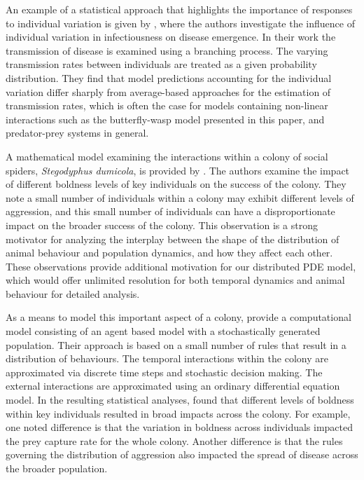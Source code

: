 \documentclass[review,authoryear]{elsarticle}
\begin{document}
An example of a statistical approach that highlights the importance of
responses to individual variation is given by \cite{SuperspreadingLloyd}, where the authors investigate the influence of individual variation in infectiousness on disease emergence. In their work the transmission of
disease is examined using a branching process. The varying
transmission rates between individuals are treated as a given
probability distribution. They find that model predictions accounting for the individual variation differ sharply from average-based approaches for the estimation of transmission rates, which is often the case for models containing non-linear interactions such as the butterfly-wasp model presented in this paper, and predator-prey systems in general.

A mathematical model examining the interactions within a colony of
social spiders, \textit{Stegodyphus dumicola}, is provided by \cite{doi:10.1086/687235}. The authors  examine the impact of different boldness levels of
 key individuals on the success of the colony.  They note a small number of individuals within
a colony may exhibit different levels of aggression, and this small
number of individuals can have a disproportionate impact on the
broader success of the colony. This observation is a strong motivator for analyzing the interplay between the shape of the distribution of animal behaviour and population dynamics, and how they affect each other. These observations provide additional motivation for our distributed PDE model, which would offer unlimited resolution for both temporal dynamics and animal behaviour for detailed analysis.

As a means to model this important aspect of a colony, \cite{doi:10.1086/687235} provide a computational model
consisting of an agent based model with a stochastically generated
population. Their approach is based on a small number of rules that
result in a distribution of behaviours. The temporal interactions
within the colony are approximated via discrete time steps and
stochastic decision making. The external interactions are approximated
using an ordinary differential equation model.
In the resulting statistical analyses, \cite{doi:10.1086/687235} found that different levels of boldness
within key individuals resulted in broad impacts across the colony. For example, one noted difference is that the variation in
boldness across individuals impacted the prey capture rate for the whole colony. Another difference is that
the rules governing the distribution of aggression also impacted the spread of disease across the broader population.
\end{document}
